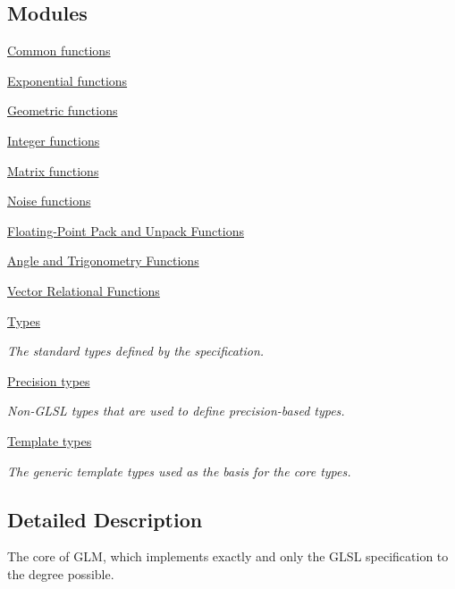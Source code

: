 \subsection*{Modules}
\begin{DoxyCompactItemize}
\item 
\hyperlink{group__core__func__common}{Common functions}
\item 
\hyperlink{group__core__func__exponential}{Exponential functions}
\item 
\hyperlink{group__core__func__geometric}{Geometric functions}
\item 
\hyperlink{group__core__func__integer}{Integer functions}
\item 
\hyperlink{group__core__func__matrix}{Matrix functions}
\item 
\hyperlink{group__core__func__noise}{Noise functions}
\item 
\hyperlink{group__core__func__packing}{Floating-\/\+Point Pack and Unpack Functions}
\item 
\hyperlink{group__core__func__trigonometric}{Angle and Trigonometry Functions}
\item 
\hyperlink{group__core__func__vector__relational}{Vector Relational Functions}
\item 
\hyperlink{group__core__types}{Types}
\begin{DoxyCompactList}\small\item\em The standard types defined by the specification. \end{DoxyCompactList}\item 
\hyperlink{group__core__precision}{Precision types}
\begin{DoxyCompactList}\small\item\em Non-\/\+G\+L\+SL types that are used to define precision-\/based types. \end{DoxyCompactList}\item 
\hyperlink{group__core__template}{Template types}
\begin{DoxyCompactList}\small\item\em The generic template types used as the basis for the core types. \end{DoxyCompactList}\end{DoxyCompactItemize}


\subsection{Detailed Description}
The core of G\+LM, which implements exactly and only the G\+L\+SL specification to the degree possible. 

